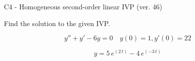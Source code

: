 \begin{exercise}
  \begin{exerciseTitle}C4 - Homogeneous second-order linear IVP (ver. 46)\end{exerciseTitle}
  \begin{exerciseStatement}
    
Find the solution to the given IVP.

    
\[y''+y'-6y = 0 \hspace{1em} y(0) = 1 , y'(0) = 22\]

  \end{exerciseStatement}
  \begin{exerciseAnswer}
    
\[y= 5 \, e^{\left(2 \, t\right)} - 4 \, e^{\left(-3 \, t\right)}\]

  \end{exerciseAnswer}
\end{exercise}